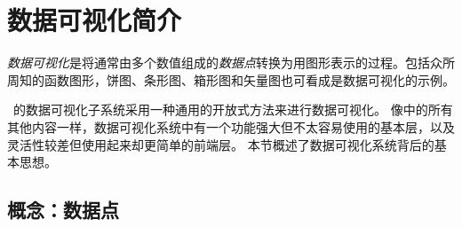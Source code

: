 %
%
%


\section{数据可视化简介}


\emph{数据可视化}是将通常由多个数值组成的\emph{数据点}转换为用图形表示的过程。包括众所周知的函数图形，饼图、条形图、箱形图和矢量图也可看成是数据可视化的示例。


\pgfname\ 的数据可视化子系统采用一种通用的开放式方法来进行数据可视化。 像\pgfname 中的所有其他内容一样，数据可视化系统中有一个功能强大但不太容易使用的基本层，以及灵活性较差但使用起来却更简单的前端层。 本节概述了数据可视化系统背后的基本思想。


\subsection{概念：数据点}
\label{section-dv-intro-data-points}


